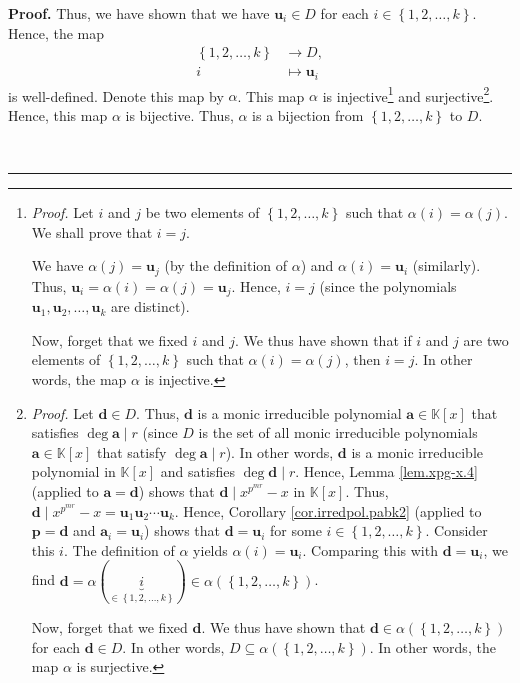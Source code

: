 \documentclass[numbers=enddot,12pt,final,onecolumn,notitlepage]{scrartcl}%
\theoremstyle{definition}
\newenvironment{proof}[1][Proof]{\noindent\textbf{#1.} }{\ \rule{0.5em}{0.5em}}
\begin{document}
\begin{proof}
Thus, we have shown that we have $\mathbf{u}_{i}\in D$ for each $i\in\left\{
1,2,\ldots,k\right\}  $. Hence, the map%
\begin{align*}
\left\{  1,2,\ldots,k\right\}   &  \rightarrow D,\\
i  &  \mapsto\mathbf{u}_{i}%
\end{align*}
is well-defined. Denote this map by $\alpha$. This map $\alpha$ is
injective\footnote{\textit{Proof.} Let $i$ and $j$ be two elements of
$\left\{  1,2,\ldots,k\right\}  $ such that $\alpha\left(  i\right)
=\alpha\left(  j\right)  $. We shall prove that $i=j$.
\par
We have $\alpha\left(  j\right)  =\mathbf{u}_{j}$ (by the definition of
$\alpha$) and $\alpha\left(  i\right)  =\mathbf{u}_{i}$ (similarly). Thus,
$\mathbf{u}_{i}=\alpha\left(  i\right)  =\alpha\left(  j\right)
=\mathbf{u}_{j}$. Hence, $i=j$ (since the polynomials $\mathbf{u}%
_{1},\mathbf{u}_{2},\ldots,\mathbf{u}_{k}$ are distinct).
\par
Now, forget that we fixed $i$ and $j$. We thus have shown that if $i$ and $j$
are two elements of $\left\{  1,2,\ldots,k\right\}  $ such that $\alpha\left(
i\right)  =\alpha\left(  j\right)  $, then $i=j$. In other words, the map
$\alpha$ is injective.} and surjective\footnote{\textit{Proof.} Let
$\mathbf{d}\in D$. Thus, $\mathbf{d}$ is a monic irreducible polynomial
$\mathbf{a}\in\mathbb{K}\left[  x\right]  $ that satisfies $\deg\mathbf{a}\mid
r$ (since $D$ is the set of all monic irreducible polynomials $\mathbf{a}%
\in\mathbb{K}\left[  x\right]  $ that satisfy $\deg\mathbf{a}\mid r$). In
other words, $\mathbf{d}$ is a monic irreducible polynomial in $\mathbb{K}%
\left[  x\right]  $ and satisfies $\deg\mathbf{d}\mid r$. Hence, Lemma
\ref{lem.xpg-x.4} (applied to $\mathbf{a}=\mathbf{d}$) shows that
$\mathbf{d}\mid x^{p^{mr}}-x$ in $\mathbb{K}\left[  x\right]  $. Thus,
$\mathbf{d}\mid x^{p^{mr}}-x=\mathbf{u}_{1}\mathbf{u}_{2}\cdots\mathbf{u}_{k}%
$. Hence, Corollary \ref{cor.irredpol.pabk2} (applied to $\mathbf{p}%
=\mathbf{d}$ and $\mathbf{a}_{i}=\mathbf{u}_{i}$) shows that $\mathbf{d}%
=\mathbf{u}_{i}$ for some $i\in\left\{  1,2,\ldots,k\right\}  $. Consider this
$i$. The definition of $\alpha$ yields $\alpha\left(  i\right)  =\mathbf{u}%
_{i}$. Comparing this with $\mathbf{d}=\mathbf{u}_{i}$, we find $\mathbf{d}%
=\alpha\left(  \underbrace{i}_{\in\left\{  1,2,\ldots,k\right\}  }\right)
\in\alpha\left(  \left\{  1,2,\ldots,k\right\}  \right)  $.
\par
Now, forget that we fixed $\mathbf{d}$. We thus have shown that $\mathbf{d}%
\in\alpha\left(  \left\{  1,2,\ldots,k\right\}  \right)  $ for each
$\mathbf{d}\in D$. In other words, $D\subseteq\alpha\left(  \left\{
1,2,\ldots,k\right\}  \right)  $. In other words, the map $\alpha$ is
surjective.}. Hence, this map $\alpha$ is bijective. Thus, $\alpha$ is a
bijection from $\left\{  1,2,\ldots,k\right\}  $ to $D$.


\end{proof}
\end{document}
